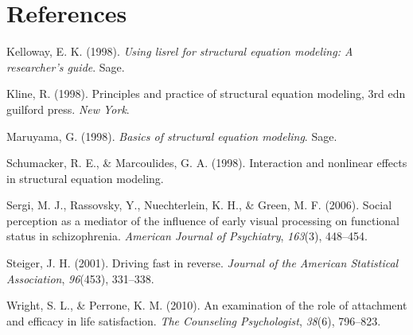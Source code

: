 \documentclass[jou]{apa6}
\theoremstyle{definition}
\theoremstyle{definition}
\theoremstyle{definition}
\theoremstyle{remark}
\begin{document}
\hypertarget{references}{%
\section{References}\label{references}}

\setlength{\parindent}{-0.5in}
\setlength{\leftskip}{0.5in}

\hypertarget{refs}{}
\leavevmode\hypertarget{ref-kelloway1998using}{}%
Kelloway, E. K. (1998). \emph{Using lisrel for structural equation
modeling: A researcher's guide}. Sage.

\leavevmode\hypertarget{ref-kline1998principles}{}%
Kline, R. (1998). Principles and practice of structural equation
modeling, 3rd edn guilford press. \emph{New York}.

\leavevmode\hypertarget{ref-maruyama1998basics}{}%
Maruyama, G. (1998). \emph{Basics of structural equation modeling}.
Sage.

\leavevmode\hypertarget{ref-schumacker1998interaction}{}%
Schumacker, R. E., \& Marcoulides, G. A. (1998). Interaction and
nonlinear effects in structural equation modeling.

\leavevmode\hypertarget{ref-sergi2006social}{}%
Sergi, M. J., Rassovsky, Y., Nuechterlein, K. H., \& Green, M. F.
(2006). Social perception as a mediator of the influence of early visual
processing on functional status in schizophrenia. \emph{American Journal
of Psychiatry}, \emph{163}(3), 448--454.

\leavevmode\hypertarget{ref-steiger2001driving}{}%
Steiger, J. H. (2001). Driving fast in reverse. \emph{Journal of the
American Statistical Association}, \emph{96}(453), 331--338.

\leavevmode\hypertarget{ref-wright2010examination}{}%
Wright, S. L., \& Perrone, K. M. (2010). An examination of the role of
attachment and efficacy in life satisfaction. \emph{The Counseling
Psychologist}, \emph{38}(6), 796--823.
\end{document}
